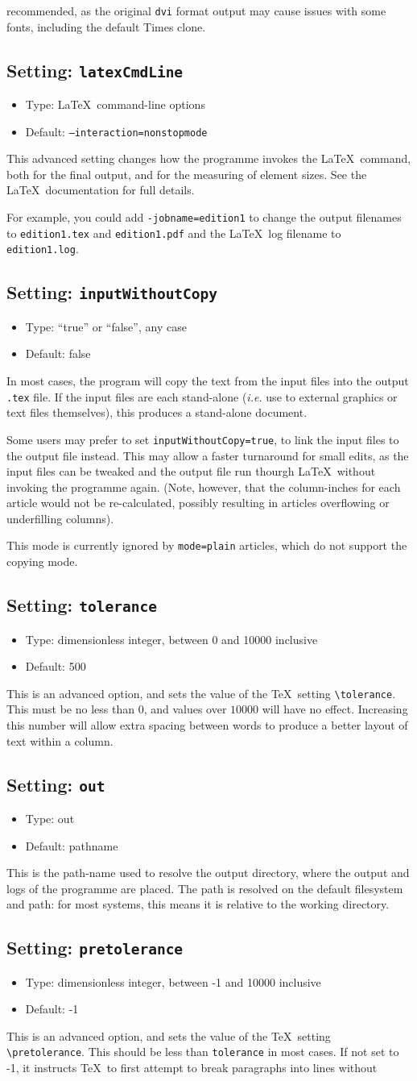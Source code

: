 \documentclass[a4paper,DIV=11]{scrartcl}
\newcommand{\property}[5]{
  \subsection{#1: \texttt{#2}}
  \begin{itemize}
  \item Type: #3
  \item Default: #4
  \end{itemize}
  #5
}
\newcommand{\setting}{\property{Setting}}
\begin{document}
\begin{multicols}{2}
{  recommended, as the original \texttt{dvi} format output may cause
  issues with some fonts, including the default Times clone.}
\setting{latexCmdLine}{\LaTeX\ command-line options}{\texttt{--interaction=nonstopmode}}{
  This advanced setting changes how the programme invokes the
  \LaTeX\ command, both for the final output, and for the measuring of
  element sizes. See the \LaTeX\ documentation for full details.\par
  For example, you could add \texttt{-jobname=edition1} to change the
  output filenames to \texttt{edition1.tex} and \texttt{edition1.pdf} and
  the \LaTeX\ log filename to \texttt{edition1.log}.
}
\setting{inputWithoutCopy}{``true'' or ``false'', any case}{false}{
  In most cases, the program will copy the text from the input files
  into the output \texttt{.tex} file. If the input files are each
  stand-alone (\textit{i.e.} use to external graphics or text files
  themselves), this produces a stand-alone document. \par
  Some users may prefer to set \texttt{inputWithoutCopy=true}, to link
  the input files to the output file instead. This may allow a faster
  turnaround for small edits, as the input files can be tweaked and
  the output file run thourgh \LaTeX\ without invoking the programme
  again. (Note, however, that the column-inches for each article would
  not be re-calculated, possibly resulting in articles overflowing or
  underfilling columns).\par
  This mode is currently ignored by \texttt{mode=plain} articles,
  which do not support the copying mode.
}
\setting{tolerance}{dimensionless integer, between 0 and 10000 inclusive}{500}{
  This is an advanced option, and sets the value of the \TeX\ setting
  \texttt{\textbackslash tolerance}. This must be no less than $0$,
  and values over $10000$ will have no effect. Increasing this number
  will allow extra spacing between words to produce a better layout of
  text within a column.}  \setting{out}{out}{pathname}{This is the
  path-name used to resolve the output directory, where the output and
  logs of the programme are placed. The path is resolved on the
  default filesystem and path: for most systems, this means it is
  relative to the working directory.}
\setting{pretolerance}{dimensionless integer, between -1 and 10000 inclusive}{-1}{
  This is an advanced option, and sets the value of the \TeX\ setting
  \texttt{\textbackslash pretolerance}. This should be less than
  \texttt{tolerance} in most cases. If not set to -1, it instructs
  \TeX\ to first attempt to break paragraphs into lines without
}
\end{multicols}
\end{document}

